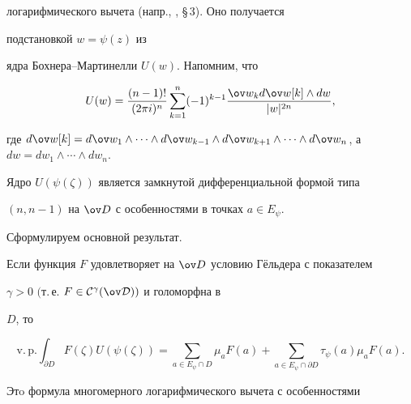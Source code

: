 логарифмического вычета (напр., \cite{AY}, \S\,3). Оно получается


подстановкой $w=\psi(z)$ из


ядра Бохнера--Мартинелли $U(w)$. Напомним, что


$$


U(w)=\dfrac{(n-1)!}{(2\pi i)^n}\sum_{k=1}^n(-1)^{k-1}\dfrac{\ov w_k d\ov w


[k]\land dw}{|w|^{2n}},


$$


где $d\ov w[k]=d\ov w_1\land\dotsb\land d\ov w_{k-1}\land d\ov w_{k+1}\land


\dotsb\land d\ov w_n$, а $dw=dw_1\land\dotsb\land dw_n$.


Ядро $U(\psi(\zeta))$ является замкнутой дифференциальной формой типа


$(n,n-1)$ на $\ov D$ с особенностями в точках $a\in E_\psi$.















Сформулируем основной результат.





\begin{thmnonum}


Если функция $F$ удовлетворяет на $\ov D$ условию Г\"ельдера с показателем


$\gamma>0$ $($т.\,е. $F\in\cal C^\gamma(\ov D))$ и голоморфна в


$D$, то


$$


\mathrm{v.\,p.}\int_{\partial D}F(\zeta)U(\psi(\zeta))=


\sum_{a\in E_\psi\cap D}


\mu_a F(a)+\sum_{a\in E_\psi\cap\partial D}\tau_\psi (a)\mu_a F(a).


$$


\end{thmnonum}





Этo формула многомерного логарифмического вычета с особенностями


